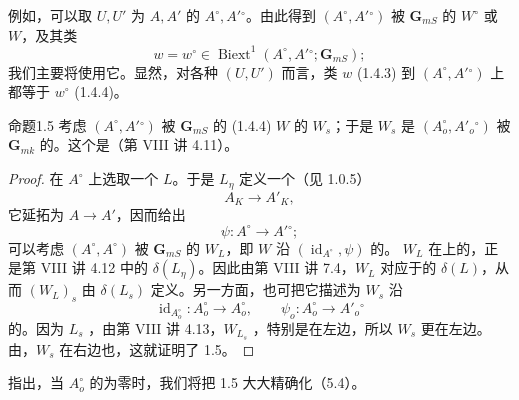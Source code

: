 例如，可以取 $U,U'$ 为 $A,A'$ 的 $A^\circ,A'{}^\circ$。由此得到 $(A^\circ,A'{}^\circ)$ 被 $\mathbf G_{mS}$ 的 $W^\circ$ 或 $W$，及其类
\[w=w^\circ\in\operatorname{Biext}^1(A^\circ,A'{}^\circ;\mathbf G_{mS});\tag{1.4.4}\]
我们主要将使用它。显然，对各种 $(U,U')$ 而言，类 $w$ (1.4.3) 到 $(A^\circ,A'{}^\circ)$ 上都等于 $w^\circ$ (1.4.4)。
\begin{SGAresult}{命题}{1.5}
考虑 $(A^\circ,A'{}^\circ)$ 被 $\mathbf G_{mS}$ 的 (1.4.4) $W$ 的 $W_s$；于是 $W_s$ 是 $(A_o^\circ,A'_o{}^\circ)$ 被 $\mathbf G_{mk}$ 的。这个是（第 VIII 讲 4.11）。
\end{SGAresult}
\begin{proof}
在 $A^\circ$ 上选取一个 $L$。于是 $L_\eta$ 定义一个（见 1.0.5）
\[A_K\longrightarrow A'_K,\]
它延拓为 $A\to A'$，因而给出
\[\psi:A^\circ\longrightarrow A'{}^\circ;\]
可以考虑 $(A^\circ,A^\circ)$ 被 $\mathbf G_{mS}$ 的 $W_L$，即 $W$ 沿 $(\operatorname{id}_{A^\circ},\psi)$ 的。
$W_L$ 在上的，正是第 VIII 讲 4.12 中的 $\delta(L_\eta)$。因此由第 VIII 讲 7.4，$W_L$ 对应于的 $\delta(L)$，从而 $(W_L)_s$ 由 $\delta(L_s)$ 定义。另一方面，也可把它描述为 $W_s$ 沿
\[\operatorname{id}_{A_o^\circ}:A_o^\circ\longrightarrow A_o^\circ,\qquad\psi_o:A_o^\circ\longrightarrow A'_o{}^\circ\]
的。因为 $L_s$ ，由第 VIII 讲 4.13，$W_{L_s}$ ，特别是在左边，所以 $W_s$ 更在左边。由，$W_s$ 在右边也，这就证明了 1.5。
\end{proof}
指出，当 $A_o^\circ$ 的为零时，我们将把 1.5 大大精确化（5.4）。

